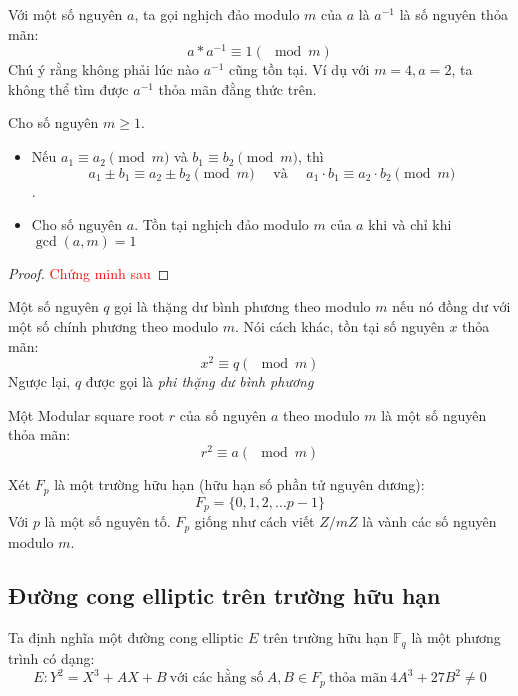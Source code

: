 \begin{definition}
	Với một số nguyên $a$, ta gọi nghịch đảo modulo $m$ của $a$ là $a^{-1}$ là số nguyên thỏa mãn:
	$$a * a^{-1} \equiv 1 (\mod{m})$$
	Chú ý rằng không phải lúc nào $a^{-1}$ cũng tồn tại. Ví dụ với $m = 4, a = 2$, ta không thể tìm được $a^{-1}$ thỏa mãn đằng thức trên.
\end{definition}
\begin{proposition}
	\label{pr:13}
	Cho số nguyên $m \geq 1$.
	\begin{itemize}
		\item Nếu $a_1 \equiv a_2 \pmod{m}$ và $b_1 \equiv b_2 \pmod{m}$, thì
		      $$a_1 \pm b_1 \equiv a_2 \pm b_2 \pmod{m} \quad \text{ và } \quad a_1 \cdot b_1 \equiv a_2 \cdot b_2 \pmod{m}$$.
		\item Cho số nguyên $a$. Tồn tại nghịch đảo modulo $m$ của $a$ khi và chỉ khi $\gcd(a,m) = 1$
	\end{itemize}
\end{proposition}
\begin{proof}
	\textcolor{red}{Chứng minh sau}
\end{proof}

\begin{definition}
	Một số nguyên $q$ gọi là thặng dư bình phương theo modulo $m$ nếu nó đồng dư với một số chính phương theo modulo $m$.
	Nói cách khác, tồn tại số nguyên $x$ thỏa mãn:
	$$x^2 \equiv q (\mod{m})$$
	Ngược lại, $q$ được gọi là \textit{phi thặng dư bình phương}

\end{definition}

\begin{definition}
	Một Modular square root $r$ của số nguyên $a$ theo modulo $m$ là một số nguyên thỏa mãn:
	$$r^2 \equiv a (\mod{m})$$
\end{definition}

Xét $F_p$ là một trường hữu hạn (hữu hạn số phần tử nguyên dương):
$$F_p = \{0, 1, 2, \ldots p-1\}$$
Với $p$ là một số nguyên tố. $F_p$ giống như cách viết $Z/mZ$ là vành các số nguyên modulo $m$.
\subsection{Đường cong elliptic trên trường hữu hạn}

Ta định nghĩa một đường cong elliptic $E$ trên trường hữu hạn $\mathbb{F}_q$ là một phương trình có dạng:
$$E: Y^2 = X^3 + AX + B\ \text{với các hằng số}\ A, B \in F_p\ \text{thỏa mãn}\ 4A^3 + 27B^2 \neq 0$$



